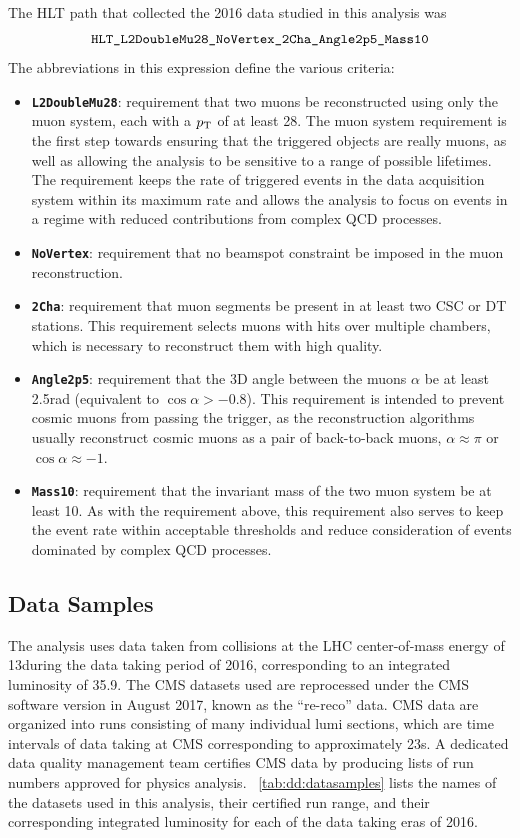 The HLT path that collected the 2016 data studied in this analysis was
$$\texttt{HLT\_L2DoubleMu28\_NoVertex\_2Cha\_Angle2p5\_Mass10}$$
The abbreviations in this expression define the various criteria:
\begin{itemize}
  \item \texttt{\textbf{L2DoubleMu28}}: requirement that two muons be reconstructed using only the muon system, each with a $p_{\mathrm{T}}$ of at least 28\GeV. The muon system requirement is the first step towards ensuring that the triggered objects are really muons, as well as allowing the analysis to be sensitive to a range of possible lifetimes. The \pT requirement keeps the rate of triggered events in the data acquisition system within its maximum rate and allows the analysis to focus on events in a regime with reduced contributions from complex QCD processes.
  \item \texttt{\textbf{NoVertex}}: requirement that no beamspot constraint be imposed in the muon reconstruction.
  \item \texttt{\textbf{2Cha}}: requirement that muon segments be present in at least two CSC or DT stations. This requirement selects muons with hits over multiple chambers, which is necessary to reconstruct them with high quality.
  \item \texttt{\textbf{Angle2p5}}: requirement that the 3D angle between the muons $\alpha$ be at least 2.5\unit{rad} (equivalent to $\cos{\alpha} > -0.8$). This requirement is intended to prevent cosmic muons from passing the trigger, as the reconstruction algorithms usually reconstruct cosmic muons as a pair of back-to-back muons, \ie $\alpha \approx \pi$ or $\cos{\alpha} \approx -1$.
  \item \texttt{\textbf{Mass10}}: requirement that the invariant mass of the two muon system \mMuMu be at least 10\GeV. As with the \pT requirement above, this requirement also serves to keep the event rate within acceptable thresholds and reduce consideration of events dominated by complex QCD processes.
\end{itemize}

\subsection{Data Samples}
The analysis uses data taken from \pp collisions at the LHC center-of-mass energy of 13\TeV during the data taking period of 2016, corresponding to an integrated luminosity of 35.9\fbinv.
The CMS datasets used are reprocessed under the CMS software version  in August 2017, known as the ``re-reco'' data.
CMS data are organized into runs consisting of many individual lumi sections, which are time intervals of data taking at CMS corresponding to approximately 23\unit{s}.
A dedicated data quality management team certifies CMS data by producing lists of run numbers approved for physics analysis.
\Tab~\ref{tab:dd:datasamples} lists the names of the datasets used in this analysis, their certified run range, and their corresponding integrated luminosity for each of the data taking eras of 2016.

